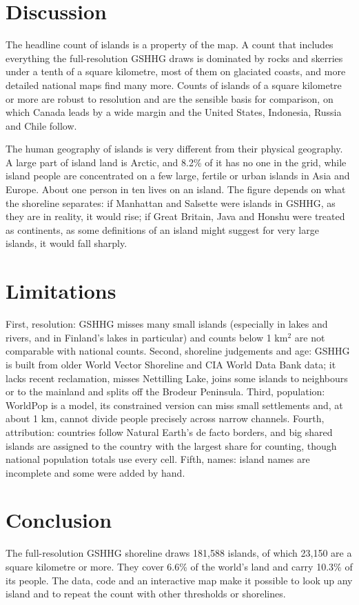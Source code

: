 \documentclass[11pt,a4paper]{article}
\begin{document}
\section{Discussion}
The headline count of islands is a property of the map. A count that includes everything the full-resolution GSHHG draws is dominated by rocks and skerries under a tenth of a square kilometre, most of them on glaciated coasts, and more detailed national maps find many more. Counts of islands of a square kilometre or more are robust to resolution and are the sensible basis for comparison, on which Canada leads by a wide margin and the United States, Indonesia, Russia and Chile follow.

The human geography of islands is very different from their physical geography. A large part of island land is Arctic, and 8.2\% of it has no one in the grid, while island people are concentrated on a few large, fertile or urban islands in Asia and Europe. About one person in ten lives on an island. The figure depends on what the shoreline separates: if Manhattan and Salsette were islands in GSHHG, as they are in reality, it would rise; if Great Britain, Java and Honshu were treated as continents, as some definitions of an island might suggest for very large islands, it would fall sharply.

\section{Limitations}
First, resolution: GSHHG misses many small islands (especially in lakes and rivers, and in Finland's lakes in particular) and counts below 1 km$^2$ are not comparable with national counts. Second, shoreline judgements and age: GSHHG is built from older World Vector Shoreline and CIA World Data Bank data; it lacks recent reclamation, misses Nettilling Lake, joins some islands to neighbours or to the mainland and splits off the Brodeur Peninsula. Third, population: WorldPop is a model, its constrained version can miss small settlements and, at about 1 km, cannot divide people precisely across narrow channels. Fourth, attribution: countries follow Natural Earth's de facto borders, and big shared islands are assigned to the country with the largest share for counting, though national population totals use every cell. Fifth, names: island names are incomplete and some were added by hand.

\section{Conclusion}
The full-resolution GSHHG shoreline draws 181,588 islands, of which 23,150 are a square kilometre or more. They cover 6.6\% of the world's land and carry 10.3\% of its people. The data, code and an interactive map make it possible to look up any island and to repeat the count with other thresholds or shorelines.
\end{document}
